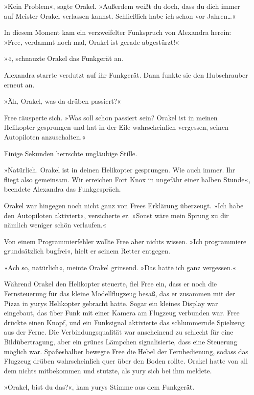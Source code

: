»Kein Problem«, sagte Orakel. »Außerdem weißt du doch, dass du dich immer auf Meister Orakel verlassen kannst. Schließlich habe ich schon vor Jahren…«

In diesem Moment kam ein verzweifelter Funkspruch von Alexandra herein: »Free, verdammt noch mal, Orakel ist gerade abgestürzt!«

»«, schnauzte Orakel das Funkgerät an.

Alexandra starrte verdutzt auf ihr Funkgerät. Dann funkte sie den Hubschrauber erneut an.

»Äh, Orakel, was da drüben passiert?«

Free räusperte sich. »Was soll schon passiert sein? Orakel ist in meinen Helikopter gesprungen und hat in der Eile wahrscheinlich vergessen, seinen Autopiloten anzuschalten.«

Einige Sekunden herrschte ungläubige Stille.

»Natürlich. Orakel ist in deinen Helikopter gesprungen. Wie auch immer. Ihr fliegt also gemeinsam. Wir erreichen Fort Knox in ungefähr einer halben Stunde«, beendete Alexandra das Funkgespräch.

Orakel war hingegen noch nicht ganz von Frees Erklärung überzeugt. »Ich habe den Autopiloten aktiviert«, versicherte er. »Sonst wäre mein Sprung zu dir nämlich weniger schön verlaufen.«

Von einem Programmierfehler wollte Free aber nichts wissen. »Ich programmiere grundsätzlich bugfrei«, hielt er seinem Retter entgegen.

»Ach so, natürlich«, meinte Orakel grinsend. »Das hatte ich ganz vergessen.«

Während Orakel den Helikopter steuerte, fiel Free ein, dass er noch die Fernsteuerung für das kleine Modellflugzeug besaß, das er zusammen mit der Pizza in yurys Helikopter gebracht hatte. Sogar ein kleines Display war eingebaut, das über Funk mit einer Kamera am Flugzeug verbunden war. Free drückte einen Knopf, und ein Funksignal aktivierte das schlummernde Spielzeug aus der Ferne. Die Verbindungsqualität war anscheinend zu schlecht für eine Bildübertragung, aber ein grünes Lämpchen signalisierte, dass eine Steuerung möglich war. Spaßeshalber bewegte Free die Hebel der Fernbedienung, sodass das Flugzeug drüben wahrscheinlich quer über den Boden rollte. Orakel hatte von all dem nichts mitbekommen und stutzte, als yury sich bei ihm meldete.

»Orakel, bist du das?«, kam yurys Stimme aus dem Funkgerät.

